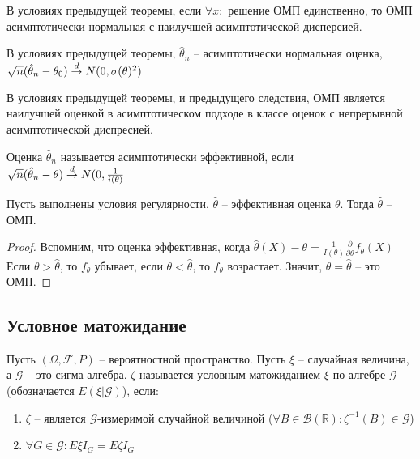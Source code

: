 \documentclass[document.tex]{subfiles}
\begin{document}
\begin{corollary}
    В условиях предыдущей теоремы, если $\forall x:$ решение ОМП единственно, то ОМП асимптотически нормальная с наилучшей асимптотической дисперсией.
\end{corollary}

\begin{theorem}[Бахадур]
    В условиях предыдущей теоремы, $\hat \theta_n$ -- асимптотически нормальная оценка, $\sqrt{n}(\hat \theta_n -
    \theta_0) \stackrel{d}{\rightarrow} N(0, \sigma(\theta)^2)$
\end{theorem}

\begin{corollary}
    В условиях предыдущей теоремы, и предыдущего следствия, ОМП является наилучшей оценкой в асимптотическом подходе в
    классе оценок с непрерывной асимптотической диспресией.
\end{corollary}

\begin{definition}
    Оценка $\hat \theta_n$ называется асимптотически эффективной, если $\sqrt{n}(\hat \theta_n - \theta) \stackrel{d}{\rightarrow} N(0,
    \frac{1}{i(\theta)}$
\end{definition}

\begin{theorem}
    Пусть выполнены условия регулярности, $\hat \theta$ -- эффективная оценка $\theta$. Тогда $\hat \theta$ -- ОМП.
\end{theorem}

\begin{proof}
    Вспомним, что оценка эффективная, когда $\hat \theta(X) - \theta = \frac{1}{I(\theta)}\frac{\partial}{\partial
    \theta}f_{\theta}(X)$ Если $\theta > \hat \theta$, то $f_{\theta}$ убывает, если $\theta < \hat \theta$, то
    $f_{\theta}$ возрастает. Значит, $\theta = \hat \theta$ -- это ОМП.
\end{proof}

\subsection{Условное матожидание}
\begin{definition}
    Пусть $(\Omega, \mathcal{F}, P)$ -- вероятностной пространство. Пусть $\xi$ -- случайная величина, а
    $\mathcal{G}$ -- это сигма алгебра. $\zeta$ называется условным матожиданием $\xi$ по алгебре $\mathcal{G}$
    (обозначается $E(\xi | \mathcal{G})$), если:
    \begin{enumerate}
        \item $\zeta$ -- является $\mathcal{G}$-измеримой случайной величиной ($\forall B \in
            \mathcal{B}(\mathbb{R}): \zeta^{-1}(B) \in \mathcal{G}$)
        \item $\forall G \in \mathcal{G}: E \xi I_G = E \zeta I_G$
    \end{enumerate}
\end{definition}
\end{document}

